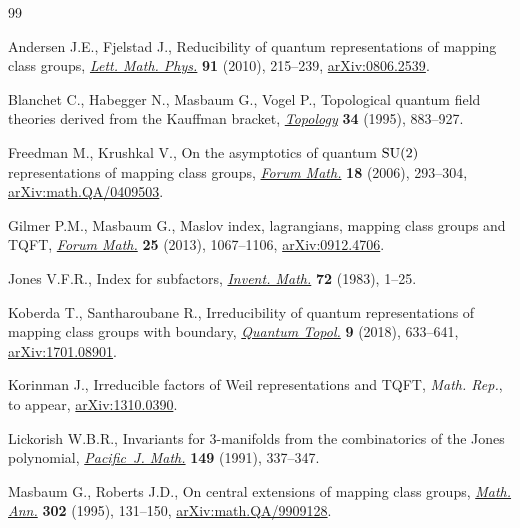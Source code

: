 \documentclass[pdftex]{sigma}
\numberwithin{equation}{section}
\begin{document}
\begin{thebibliography}{99}
\footnotesize\itemsep=0pt

Andersen J.E., Fjelstad J., Reducibility of quantum representations of mapping
 class groups, \href{https://doi.org/10.1007/s11005-009-0367-7}{\textit{Lett. Math. Phys.}} \textbf{91} (2010), 215--239,
 \href{https://arxiv.org/abs/0806.2539}{arXiv:0806.2539}.

Blanchet C., Habegger N., Masbaum G., Vogel P., Topological quantum field
 theories derived from the {K}auffman bracket, \href{https://doi.org/10.1016/0040-9383(94)00051-4}{\textit{Topology}} \textbf{34}
 (1995), 883--927.

Freedman M., Krushkal V., On the asymptotics of quantum {${\rm SU}(2)$}
 representations of mapping class groups, \href{https://doi.org/10.1515/FORUM.2006.017}{\textit{Forum Math.}} \textbf{18}
 (2006), 293--304, \href{https://arxiv.org/abs/math.QA/0409503}{arXiv:math.QA/0409503}.

Gilmer P.M., Masbaum G., Maslov index, lagrangians, mapping class groups and
 {TQFT}, \href{https://doi.org/10.1515/form.2011.143}{\textit{Forum Math.}} \textbf{25} (2013), 1067--1106,
 \href{https://arxiv.org/abs/0912.4706}{arXiv:0912.4706}.

Jones V.F.R., Index for subfactors, \href{https://doi.org/10.1007/BF01389127}{\textit{Invent. Math.}} \textbf{72} (1983),
 1--25.

Koberda T., Santharoubane R., Irreducibility of quantum representations of
 mapping class groups with boundary, \href{https://doi.org/10.4171/QT/116}{\textit{Quantum Topol.}} \textbf{9}
 (2018), 633--641, \href{https://arxiv.org/abs/1701.08901}{arXiv:1701.08901}.

Korinman J., Irreducible factors of {W}eil representations and {TQFT},
 \textit{Math. Rep.}, {t}o appear, \href{https://arxiv.org/abs/1310.0390}{arXiv:1310.0390}.

Lickorish W.B.R., Invariants for 3-manifolds from the combinatorics of the
 {J}ones polynomial, \href{https://doi.org/10.2140/pjm.1991.149.337}{\textit{Pacific~J. Math.}} \textbf{149} (1991), 337--347.

Masbaum G., Roberts J.D., On central extensions of mapping class groups,
 \href{https://doi.org/10.1007/BF01444490}{\textit{Math. Ann.}} \textbf{302} (1995), 131--150, \href{https://arxiv.org/abs/math.QA/9909128}{arXiv:math.QA/9909128}.


\end{thebibliography}
\end{document}
